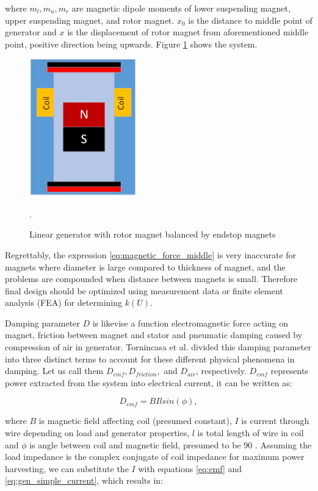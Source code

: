 where $m_l, m_u, m_r$ are magnetic dipole moments of lower suspending magnet, upper suspending magnet, and rotor magnet. $x_0$ is the distance to middle point of generator and $x$ is the displacement of rotor magnet from aforementioned middle point, positive direction being upwards. Figure \ref{fig:lg} shows the system.

\begin{figure}[htb]
\begin{center}
\includegraphics[height=6cm]{images/own_dwg/generator}
\end{center}
\caption{Linear generator with rotor magnet balanced by endstop magnets}.
\label{fig:lg}
\end{figure}

Regrettably, the expression \eqref{eq:magnetic_force_middle} is very inaccurate for magnets where diameter is large compared to thickness of magnet, and the problems are compounded when distance between magnets is small. Therefore final design should be optimized using measurement data or finite element analysis (FEA) for determining $k(U)$. 

Damping parameter $D$ is likevise a function electromagnetic force acting on magnet, friction between magnet and stator and pneumatic damping caused by compression of air in generator. Tornincasa et al. \cite{Tornincasa2012} divided this damping parameter into three distinct terms to account for these different physical phenomena in damping. Let us call them $D_{emf}, D_{friction},$ and $D_{air}$, respectively. $D_{emf}$ represents power extracted from the system into electrical current, it can be written as:

\begin{equation}\label{eq:d_emd}
  D_{emf} = BIlsin(\phi),
\end{equation}

where $B$ is magnetic field affecting coil (presumed constant), $I$ is current through wire depending on load and generator properties, $l$ is total length of wire in coil and $\phi$ is angle between coil and magnetic field, presumed to be 90 \degree. Assuming the load impedance is the complex conjugate of coil impedance for maximum power harvesting, we can substitute the $I$ with equations \eqref{eq:emf} and \eqref{eq:gen_simple_current}, which results in: 

